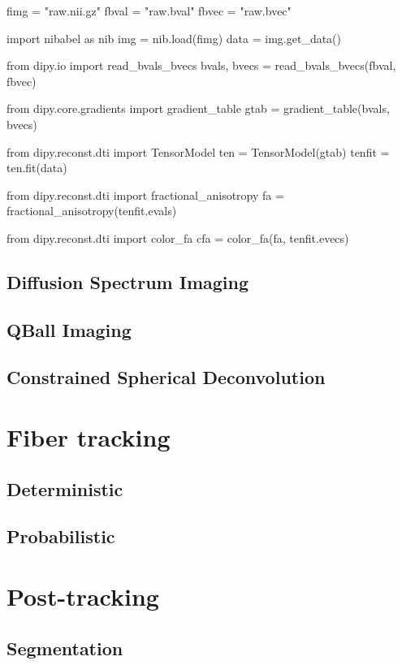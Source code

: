 \documentclass{bioinfo}
\begin{document}
\begin{python}
fimg = "raw.nii.gz"
fbval = "raw.bval"
fbvec = "raw.bvec"

import nibabel as nib
img = nib.load(fimg)
data = img.get_data()

from dipy.io import read_bvals_bvecs
bvals, bvecs = read_bvals_bvecs(fbval, fbvec)

from dipy.core.gradients import gradient_table
gtab = gradient_table(bvals, bvecs)

from dipy.reconst.dti import TensorModel
ten = TensorModel(gtab)
tenfit = ten.fit(data)

from dipy.reconst.dti import fractional_anisotropy
fa = fractional_anisotropy(tenfit.evals)

from dipy.reconst.dti import color_fa
cfa = color_fa(fa, tenfit.evecs)
\end{python}

\subsection{Diffusion Spectrum Imaging}

\subsection{QBall Imaging}

\subsection{Constrained Spherical Deconvolution} 

\section{Fiber tracking}

\subsection{Deterministic}

\subsection{Probabilistic}

\section{Post-tracking}

\subsection{Segmentation}
\end{document}
